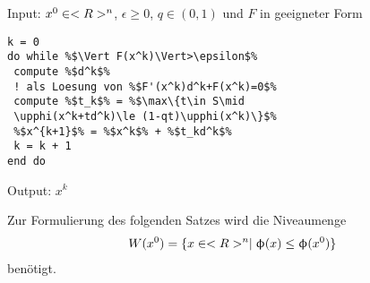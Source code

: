 \begin{algorithm}
	Input: $x^0\in<R>^n$, $\epsilon\ge 0$, $q\in (0,1)$ und $F$ in geeigneter Form
	\begin{lstlisting}
k = 0
do while %$\Vert F(x^k)\Vert>\epsilon$%
 compute %$d^k$%
 ! als Loesung von %$F'(x^k)d^k+F(x^k)=0$%
 compute %$t_k$% = %$\max\{t\in S\mid 
 \upphi(x^k+td^k)\le (1-qt)\upphi(x^k)\}$%
 %$x^{k+1}$% = %$x^k$% + %$t_kd^k$%
 k = k + 1
end do
	\end{lstlisting}
	Output: $x^k$
\end{algorithm}

Zur Formulierung des folgenden Satzes wird die Niveaumenge
\begin{align}
	W(x^0) = \{x\in<R>^n\mid \upphi(x) \le \upphi(x^0)\}\notag
\end{align}
benötigt.

